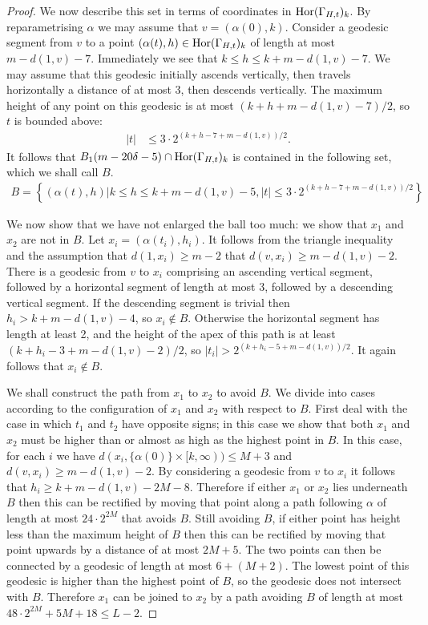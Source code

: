 \begin{proof}
  We now describe this set in terms of coordinates in $\operatorname{Hor}(\Gamma_{H,t})_k$.
  By reparametrising $\alpha$ we may assume that $v = (\alpha(0), k)$.
  Consider a geodesic segment from $v$ to a point $(\alpha(t), h) \in \operatorname{Hor}(\Gamma_{H,t})_k$ of length at most $m - d(1,v) - 7$.
  Immediately we see that $k \leq h \leq k + m - d(1,v) - 7$.
  We may assume that this geodesic initially ascends vertically, then travels horizontally a distance of at most 3, then descends vertically. 
  The maximum height of any point on this geodesic is at most $(k + h + m - d(1,v) - 7)/2$, so $t$ is bounded above:
  \begin{align*}
    \left|t\right| &\leq 3\cdot2^{(k + h - 7 + m - d(1,v))/2}.
  \end{align*}
  It follows that $B_1(m - 20\delta - 5) \cap \operatorname{Hor}(\Gamma_{H,t})_k$ is contained in the following set, which we shall call $B$.
  \begin{align*}
    B = \left\{ (\alpha(t), h) \vert k \leq h \leq k + m - d(1,v) - 5, \left|t\right| \leq 3\cdot2^{(k + h - 7 + m - d(1,v))/2}\right\}
  \end{align*}

  We now show that we have not enlarged the ball too much: we show that $x_1$ and $x_2$ are not in $B$.
  Let $x_i = (\alpha(t_i), h_i)$.
  It follows from the triangle inequality and the assumption that $d(1, x_i) \geq m - 2$ that $d(v, x_i) \geq m - d(1,v) - 2$.
  There is a geodesic from $v$ to $x_i$ comprising an ascending vertical segment, followed by a horizontal segment of length at most 3, followed by a descending vertical segment.
  If the descending segment is trivial then $h_i > k + m - d(1,v) - 4$, so $x_i \notin B$.
  Otherwise the horizontal segment has length at least 2, and the height of the apex of this path is at least $(k + h_i - 3 + m - d(1,v) - 2)/2$, so $|t_i| > 2^{(k + h_i - 5 + m - d(1,v))/2}$.
  It again follows that $x_i \notin B$.

  We shall construct the path from $x_1$ to $x_2$ to avoid $B$.
  We divide into cases according to the configuration of $x_1$ and $x_2$ with respect to $B$.
  First deal with the case in which $t_1$ and $t_2$ have opposite signs; in this case we show that both $x_1$ and $x_2$ must be higher than or almost as high as the highest point in $B$.
  In this case, for each $i$ we have $d(x_i, \{\alpha(0)\} \times [k, \infty) ) \leq M+3$ and $d(v, x_i) \geq m - d(1, v) - 2$.
  By considering a geodesic from $v$ to $x_i$ it follows that $h_i \geq k + m - d(1,v) - 2M - 8$.
  Therefore if either $x_1$ or $x_2$ lies underneath $B$ then this can be rectified by moving that point along a path following $\alpha$ of length at most $24\cdot2^{2M}$ that avoids $B$.
  Still avoiding $B$, if either point has height less than the maximum height of $B$ then this can be rectified by moving that point upwards by a distance of at most $2M + 5$.
  The two points can then be connected by a geodesic of length at most $6 + (M + 2)$.
  The lowest point of this geodesic is higher than the highest point of $B$, so the geodesic does not intersect with $B$.
  Therefore $x_1$ can be joined to $x_2$ by a path avoiding $B$ of length at most $48\cdot2^{2M} + 5M + 18 \leq L - 2$.


\end{proof}
